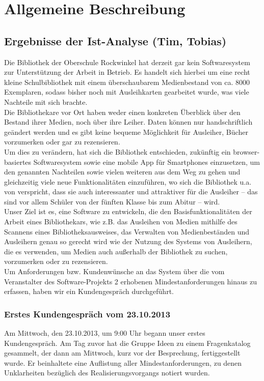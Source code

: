 \documentclass[fontsize=12pt,paper=a4,twoside]{scrartcl}
\begin{document}
\section{Allgemeine Beschreibung} \label{sec:AllgemeineBeschreibung}

\subsection{Ergebnisse der Ist-Analyse (Tim, Tobias)} \label{subsec:IstAnalyse} Die Bibliothek der Oberschule Rockwinkel hat derzeit gar kein Softwaresystem zur Unterstützung der Arbeit in Betrieb. Es handelt sich hierbei um eine recht kleine Schulbibliothek mit einem überschaubarem Medienbestand von ca. 8000 Exemplaren, sodass bisher noch mit Ausleihkarten gearbeitet wurde, was viele Nachteile mit sich brachte.\\
Die Bibliothekare vor Ort haben weder einen konkreten Überblick über den Bestand ihrer Medien, noch über ihre Leiher. Daten können nur handschriftlich geändert werden und es gibt keine bequeme Möglichkeit für Ausleiher, Bücher vorzumerken oder gar zu rezensieren.\\
Um dies zu verändern, hat sich die Bibliothek entschieden, zukünftig ein browser-basiertes Softwaresystem sowie eine mobile App für Smartphones einzusetzen, um den genannten Nachteilen sowie vielen weiteren aus dem Weg zu gehen und gleichzeitig viele neue Funktionalitäten einzuführen, wo sich die Bibliothek u.a. von verspricht, dass sie auch interessanter und attraktiver für die Ausleiher -- das sind vor allem Schüler von der fünften Klasse bis zum Abitur -- wird.\\
Unser Ziel ist es, eine Software zu entwickeln, die den Basisfunktionalitäten der Arbeit eines Bibliothekars, wie z.B. das Ausleihen von Medien mithilfe des Scannens eines Bibliotheksausweises, das Verwalten von Medienbeständen und Ausleihern genau so gerecht wird wie der Nutzung des Systems von Ausleihern, die es verwenden, um Medien auch außerhalb der Bibliothek zu suchen, vorzumerken oder zu rezensieren.\\
Um Anforderungen bzw. Kundenwünsche an das System über die vom Veranstalter des Software-Projekts 2 erhobenen Mindestanforderungen hinaus zu erfassen, haben wir ein Kundengespräch durchgeführt.

\subsubsection{Erstes Kundengespräch vom 23.10.2013} \label{subsec:Kundengespr.} Am Mittwoch, den 23.10.2013, um 9:00 Uhr begann unser erstes Kundengespräch. Am Tag zuvor hat die Gruppe Ideen zu einem Fragenkatalog gesammelt, der dann am Mittwoch, kurz vor der Besprechung, fertiggestellt wurde. Er beinhaltete eine Auflistung aller Mindestanforderungen, zu denen Unklarheiten bezüglich des Realisierungsvorgangs notiert wurden. 
\end{document}
